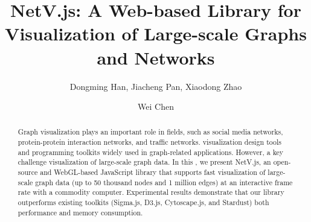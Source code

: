 \documentclass[review]{elsarticle}
\newcommand{\name}{NetV.js\xspace}
\begin{document}
\begin{CJK}{UTF8}{gbsn}
\begin{frontmatter}

\title{\name: A Web-based Library for  Visualization of Large-scale Graphs and Networks }

\author[mymainaddress,mysecondaryaddress]{Dongming Han, Jiacheng Pan, Xiaodong Zhao}
\author[mymainaddress]{Wei Chen}

\address[mymainaddress]{State Key Lab of CAD\&CG, Zhejiang University, Hangzhou, Zhejiang, China}
\address[mysecondaryaddress]{Zhejiang Lab, hangzhou, zhejiang, China}

\begin{abstract}
    Graph visualization plays an important role in  fields, such as social media networks, protein-protein interaction networks, and traffic networks.  visualization design tools and programming toolkits  widely used in graph-related applications. However, a key challenge  visualization of large-scale graph data. In this , we present \name, an open-source and WebGL-based JavaScript library that supports fast visualization of large-scale graph data (up to 50 thousand nodes and 1 million edges) at an interactive frame rate with a commodity computer. Experimental results demonstrate that our library outperforms existing toolkits (Sigma.js, D3.js, Cytoscape.js, and Stardust)  both  performance and memory consumption.

\end{abstract}
 
\begin{keyword}
\end{keyword}


\end{frontmatter}
\end{CJK}
\end{document}
